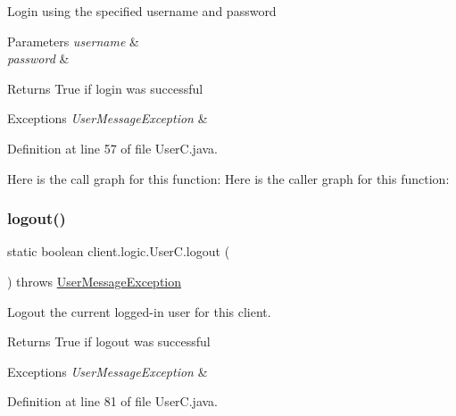Login using the specified username and password


\begin{DoxyParams}{Parameters}
{\em username} & \\
\hline
{\em password} & \\
\hline
\end{DoxyParams}
\begin{DoxyReturn}{Returns}
True if login was successful 
\end{DoxyReturn}

\begin{DoxyExceptions}{Exceptions}
{\em User\+Message\+Exception} & \\
\hline
\end{DoxyExceptions}


Definition at line 57 of file User\+C.\+java.

Here is the call graph for this function\+:
Here is the caller graph for this function\+:
\hypertarget{classclient_1_1logic_1_1_user_c_a6609a9ab9414bda2dd3a6685cdec3771}{}\label{classclient_1_1logic_1_1_user_c_a6609a9ab9414bda2dd3a6685cdec3771} 
\subsubsection{\texorpdfstring{logout()}{logout()}}
{\footnotesize\ttfamily static boolean client.\+logic.\+User\+C.\+logout (\begin{DoxyParamCaption}{ }\end{DoxyParamCaption}) throws \hyperlink{classpt_1_1up_1_1fe_1_1lpro1613_1_1sharedlib_1_1exceptions_1_1_user_message_exception}{User\+Message\+Exception}\hspace{0.3cm}{\ttfamily [static]}}

Logout the current logged-\/in user for this client.

\begin{DoxyReturn}{Returns}
True if logout was successful 
\end{DoxyReturn}

\begin{DoxyExceptions}{Exceptions}
{\em User\+Message\+Exception} & \\
\hline
\end{DoxyExceptions}


Definition at line 81 of file User\+C.\+java.

